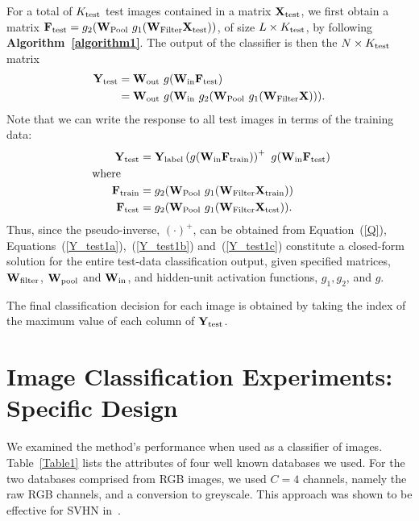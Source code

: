 \documentclass[conference]{IEEEtran}
\begin{document}
For a total of $K_{\rm test}$ test images contained in a matrix ${\bf X}_{\rm test}$, we first obtain a matrix  ${\bf F}_{\rm test}=g_2({\bf W}_{\rm Pool}~g_1({\bf W}_{\rm Filter}{\bf X_{\rm test}}))$, of size $L\times K_{\rm test}$, by following {\bf Algorithm~\ref{algorithm1}}. The output of the classifier is then the $N\times K_{\rm test}$ matrix
\begin{align}\label{Y_test}
{\bf Y}_{\rm test}& = {\bf W}_{\rm out}~g({\bf W_{\rm in}}{\bf F_{\rm test}})\\
&= {\bf W}_{\rm out}~g({\bf W_{\rm in}}~g_2({\bf W}_{\rm Pool}~g_1({\bf W}_{\rm Filter}{\bf X}))).
\end{align}
Note that we can write the response to all test images in terms of the training data:
\begin{align}
{\bf Y}_{\rm test}& = {\bf Y}_{\rm label}\left(g({\bf W_{\rm in}}{\bf F_{\rm train}})\right)^+~g({\bf W_{\rm in}}{\bf F_{\rm test}})\label{Y_test1a}\\
{\rm~where~~~~~}&\notag\\
{\bf F}_{\rm train}&=g_2({\bf W}_{\rm Pool}~g_1({\bf W}_{\rm Filter}{\bf X_{\rm train}}))\label{Y_test1b}\\
{\bf F}_{\rm test}&=g_2({\bf W}_{\rm Pool}~g_1({\bf W}_{\rm Filter}{\bf X_{\rm test}}))\label{Y_test1c}.
\end{align}
Thus, since the pseudo-inverse, $(\cdot)^+$, can be obtained from Equation~(\ref{Q}), Equations~(\ref{Y_test1a}),~(\ref{Y_test1b}) and~(\ref{Y_test1c}) constitute a closed-form solution for the entire test-data classification output, given specified matrices, ${\bf W}_{\rm filter}$, ${\bf W}_{\rm pool}$ and ${\bf W}_{\rm in}$, and hidden-unit activation functions, $g_1, g_2$, and $g$.

The final classification decision for each image is obtained by taking the index of the maximum value of each column of ${\bf Y}_{\rm test}$.



\section{Image Classification Experiments: Specific Design}\label{S:3}

We  examined the method's performance  when used as a classifier of images. Table~\ref{Table1} lists the attributes of  four well known databases we used. For the two databases comprised from RGB images, we used $C=4$ channels, namely the  raw RGB channels, and a conversion to greyscale. This approach was shown to be effective for SVHN in~\cite{Sermanet}. 
\end{document}
